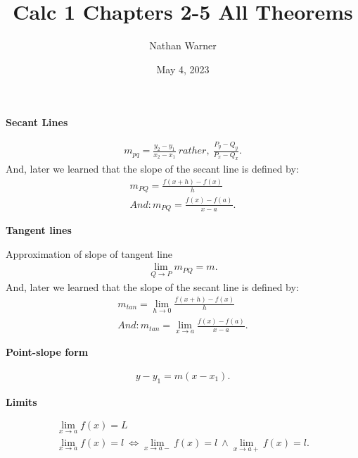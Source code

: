 \documentclass{report}
\title{\Huge{Calc 1 Chapters 2-5 All Theorems}}
\author{\huge{Nathan Warner}}
\date{\huge{May 4, 2023}}
\begin{document}
    \maketitle
    \bigbreak \noindent \bigbreak \noindent
    \begin{large}
        \textbf{Secant Lines}
    \end{large}
    \begin{align*}
          m_{pq} = \frac{y_{2}-y_{1}}{x_{2}-x_{1}}\ rather,\ \frac{P_{y} - Q_{y}}{P_{x}-Q_{x}}
    .\end{align*}
    \bigbreak \noindent \bigbreak \noindent
    And, later we learned that the  slope of the secant line is defined by:
    \begin{align*}
      m_{PQ} = \frac{f(x+h)-f(x)}{h} \\
      And:
      m_{PQ} = \frac{f(x)-f(a)}{x-a}
    .\end{align*}
    \bigbreak \noindent \bigbreak \noindent 
    \begin{large}
        \textbf{Tangent lines}
    \end{large}
    \bigbreak \noindent 
    Approximation of slope of tangent line
    \begin{align*}
        \lim\limits_{Q \to P}{m_{PQ} = m}
    .\end{align*}
    \bigbreak \noindent \bigbreak \noindent
    And, later we learned that the  slope of the secant line is defined by:
    \begin{align*}
      m_{tan} = \lim\limits_{h \to 0}{\frac{f(x+h)-f(x)}{h}} \\
      And:
      m_{tan} = \lim\limits_{x \to a}{\frac{f(x)-f(a)}{x-a}}
    .\end{align*}


    \bigbreak \noindent \bigbreak \noindent 
    \begin{large}
        \textbf{Point-slope form}
    \end{large}
    \begin{align*}
        y-y_{1} = m(x-x_{1})
    .\end{align*}

    \bigbreak \noindent \bigbreak \noindent 
    \begin{large}
        \textbf{Limits}
    \end{large}
    \begin{align*}
      \lim\limits_{x \to a}{f(x) = L}\\
      \lim\limits_{x \to a}{f(x) = l}\ \Leftrightarrow \lim\limits_{x \to a-}{f(x) = l}\ \wedge \lim\limits_{x \to a+}{f(x) = l}
    .\end{align*}
\end{document}
